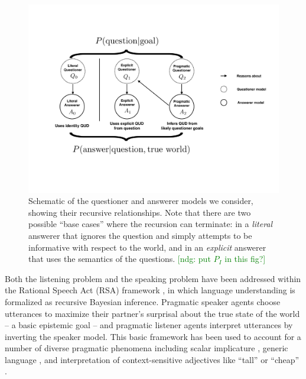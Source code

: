 \documentclass[12pt, floatsintext, jou]{apa6}
\newcommand{\ndg}[1]{\textcolor{Green}{[ndg: #1]}}
\begin{document}
\begin{figure}[t]
\begin{center}
\includegraphics[scale = .5]{models.pdf}
\end{center}
\caption{Schematic of the questioner and answerer models we consider, showing their recursive relationships. Note that there are two possible ``base cases'' where the recursion can terminate: in a \emph{literal} answerer that ignores the question and simply attempts to be informative with respect to the world, and in an \emph{explicit} answerer that uses the semantics of the questions. \ndg{put $P_I$ in this fig?}}
\label{fig:models}
\end{figure}

Both the listening problem and the speaking problem have been addressed within the Rational Speech Act (RSA) framework \cite{FrankGoodman12_PragmaticReasoningLanguageGames, GoodmanStuhlmuller13_KnowledgeImplicature, GoodmanFrank16_RSATiCS}, in which language understanding is formalized as recursive Bayesian inference. Pragmatic speaker agents choose utterances to maximize their partner's surprisal about the true state of the world -- a basic epistemic goal -- and pragmatic listener agents interpret utterances by inverting the speaker model. This basic framework has been used to account for a number of diverse pragmatic phenomena including 
scalar implicature \cite{GoodmanStuhlmuller13_KnowledgeImplicature}, %
generic language \cite{TesslerGoodman16_Generics}, and
interpretation of context-sensitive adjectives like ``tall'' or ``cheap'' \cite{LassiterGoodman15_AdjectivalVagueness}.
\end{document}
